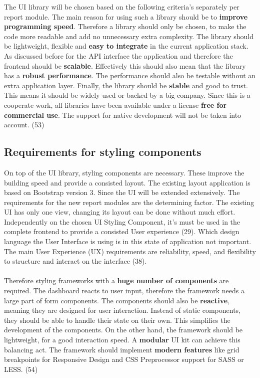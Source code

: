 \documentclass[american,a4paper,oneside,,tablecaptionabove]{scrbook}
\begin{document}
The UI library will be chosen based on the following criteria's
separately per report module. The main reason for using such a library
should be to \textbf{improve programming speed}. Therefore a library
should only be chosen, to make the code more readable and add no
unnecessary extra complexity. The library should be lightweight,
flexible and \textbf{easy to integrate} in the current application
stack. As discussed before for the API interface the application and
therefore the frontend should be \textbf{scalable}. Effectively this
should also mean that the library has a \textbf{robust performance}. The
performance should also be testable without an extra application layer.
Finally, the library should be \textbf{stable} and good to trust. This
means it should be widely used or backed by a big company. Since this is
a cooperate work, all libraries have been available under a license
\textbf{free for commercial use}. The support for native development
will not be taken into account. (53)

\subsection{Requirements for styling components}\label{sec:style-req}

On top of the UI library, styling components are necessary. These
improve the building speed and provide a consisted layout. The existing
layout application is based on Bootstrap version 3. Since the UI will be
extended extensively. The requirements for the new report modules are
the determining factor. The existing UI has only one view, changing its
layout can be done without much effort. Independently on the chosen UI
Styling Component, it's must be used in the complete frontend to provide
a consisted User experience (29). Which design language the User
Interface is using is in this state of application not important. The
main User Experience (UX) requirements are reliability, speed, and
flexibility to structure and interact on the interface (38).\\
\\
Therefore styling frameworks with a \textbf{huge number of components}
are required. The dashboard reacts to user input, therefore the
framework needs a large part of form components. The components should
also be \textbf{reactive}, meaning they are designed for user
interaction. Instead of static components, they should be able to handle
their state on their own. This simplifies the development of the
components. On the other hand, the framework should be lightweight, for
a good interaction speed. A \textbf{modular} UI kit can achieve this
balancing act. The framework should implement \textbf{modern features}
like grid breakpoints for Responsive Design and CSS Preprocessor support
for SASS or LESS. (54)
\end{document}
